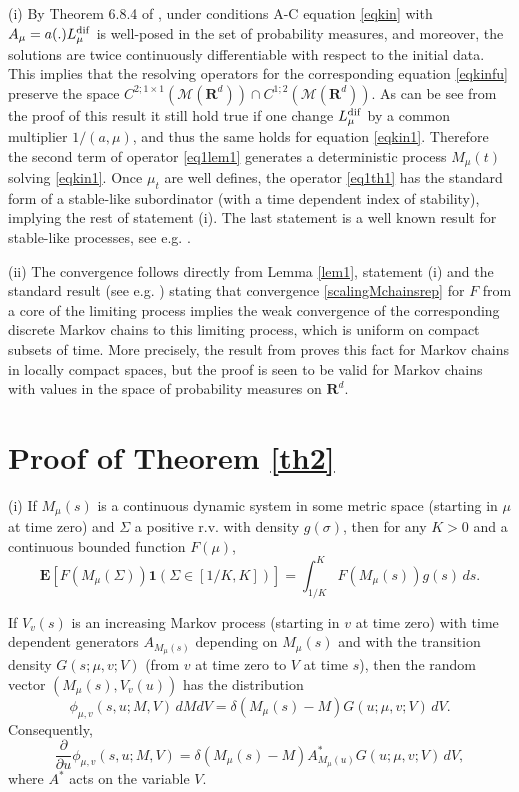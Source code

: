 \documentclass[12pt]{article}
\def\MC{\mathcal{M}}
\def\E{\mathbf{E}}
\def\R{\mathbf{R}}
\def\1{\mathbf{1}}
\def\pa{\partial}
\def\de{\delta}
\newcommand{\si}{\sigma}
\newcommand{\Si}{\Sigma}
\numberwithin{equation}{section}
\begin{document}
(i) By Theorem 6.8.4 of \cite{Kobook19}, under conditions A-C equation \eqref{eqkin} with $A_{\mu}=a(.)L^{\rm dif}_{\mu}$
is well-posed in the set of probability measures, and moreover, the solutions are twice continuously differentiable
with respect to the initial data. This implies that the resolving operators for the corresponding equation \eqref{eqkinfu}
preserve the space $C^{2;1\times 1}(\MC(\R^d))\cap C^{1;2}(\MC(\R^d))$. As can be see from the proof of this result it still hold true if one
change $L_{\mu}^{\rm dif}$ by a common multiplier $1/(a,\mu)$, and thus the same holds for equation \eqref{eqkin1}. Therefore
the second term of operator \eqref{eq1lem1} generates  a deterministic process $M_{\mu}(t)$ solving \eqref{eqkin1}.
Once $\mu_t$ are well defines, the operator \eqref{eq1th1} has the standard form of a stable-like subordinator
(with a time dependent index of stability), implying the rest of statement (i). The last statement
is a well known result for stable-like processes, see e.g. \cite{Ko11}.

(ii) The convergence follows directly from Lemma \ref{lem1}, statement (i) and the standard result (see e.g. \cite{Kal})
stating that convergence \eqref{scalingMchainsrep} for $F$ from a core of the limiting process implies
the weak convergence of the corresponding discrete Markov chains to this limiting process, which is uniform
on compact subsets of time. More precisely, the result from  \cite{Kal} proves this fact for Markov chains
in locally compact spaces, but the proof is seen to be valid for Markov chains with values in the space
of probability measures on $\R^d$.

 \section{Proof of Theorem \ref{th2}}
\label{proofTh2}

(i) If $M_{\mu}(s)$ is a continuous dynamic system in some metric space
(starting in $\mu$ at time zero) and $\Si$ a positive r.v. with density $g(\si)$,
then for any $K>0$ and a continuous bounded function $F(\mu)$,
\begin{equation}
 \label{eq1lemsubs}
\E [F(M_{\mu}(\Si))\1(\Si\in [1/K,K])]= \int_{1/K}^K  F(M_{\mu}(s)) g(s) \, ds.
\end{equation}

If $V_v(s)$ is an increasing Markov process
(starting in $v$ at time zero) with
time dependent generators $A_{M_{\mu}(s)}$ depending on $M_{\mu}(s)$ and with the
transition density $G(s;\mu,v;V)$ (from $v$ at time zero to $V$ at time $s$),
then the random vector $(M_{\mu}(s),V_v(u))$ has the distribution
\begin{equation}
 \label{eq1lemsubs1}
\phi_{\mu,v}(s,u;M,V) \, dM dV=\de (M_{\mu}(s)-M) G(u;\mu,v; V) \, dV.
\end{equation}
Consequently,
\begin{equation}
 \label{eq2lemsubs1}
\frac{\pa}{\pa u} \phi_{\mu,v}(s,u;M,V)=\de (M_{\mu}(s)-M) A^*_{M_{\mu}(u)}G(u;\mu,v; V) \, dV,
\end{equation}
where $A^*$ acts on the variable $V$.
\end{document}
